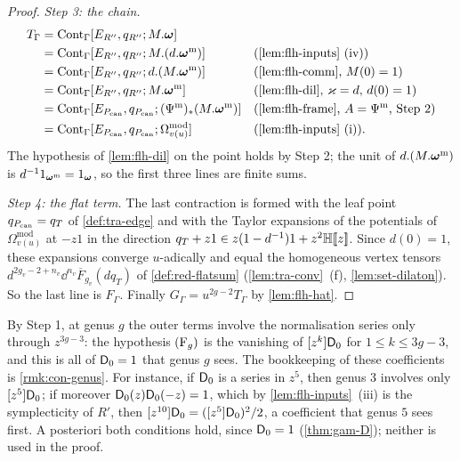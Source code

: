 \begin{proof}
\emph{Step 3: the chain.}
\begin{align*}
T_\Gamma&=\mathrm{Cont}_\Gamma[E_{R''},q_{R''};M.\TFT]&&\\
&=\mathrm{Cont}_\Gamma[E_{R''},q_{R''};M.(d.\TFT^{\mathrm m})]&&\text{(\cref{lem:flh-inputs}~(iv))}\\
&=\mathrm{Cont}_\Gamma[E_{R''},q_{R''};d.(M.\TFT^{\mathrm m})]&&\text{(\cref{lem:flh-comm}, $M(0)=1$)}\\
&=\mathrm{Cont}_\Gamma[E_{R''},q_{R''};M.\TFT^{\mathrm m}]&&\text{(\cref{lem:flh-dil}, $\varkappa=d$, $d(0)=1$)}\\
&=\mathrm{Cont}_\Gamma[E_{\Pc},q_{\Pc};(\Psi^{\mathrm m})_*(M.\TFT^{\mathrm m})]&&\text{(\cref{lem:flh-frame}, $A=\Psi^{\mathrm m}$, Step 2)}\\
&=\mathrm{Cont}_\Gamma[E_{\Pc},q_{\Pc};\Omega^{\mathrm{mod}}_{v(u)}]&&\text{(\cref{lem:flh-inputs}~(i))}.
\end{align*}
The hypothesis of \cref{lem:flh-dil} on the point holds by Step 2; the unit of $d.(M.\boldsymbol{\omega}^{\mathrm m})$ is $d^{-1}1_{\boldsymbol{\omega}^{\mathrm m}}=1_{\boldsymbol{\omega}}$, so the first three lines are finite sums.

\emph{Step 4: the flat term.} The last contraction is formed with the leaf point $q_{P_{\mathrm{can}}}=q_T$ of \cref{def:tra-edge} and with the Taylor expansions of the potentials of $\Omega^{\mathrm{mod}}_{v(u)}$ at $-z1$ in the direction $q_T+z1\in z(1-d^{-1})1+z^2\mathbb{H}[\![ z ]\!]$. Since $d(0)=1$, these expansions converge $u$-adically and equal the homogeneous vertex tensors $d^{2g_v-2+n_v}\dd^{n_v}\overline F_{g_v}(dq_T)$ of \cref{def:red-flatsum} (\cref{lem:tra-conv}~(f), \cref{lem:set-dilaton}). So the last line is $F_\Gamma$. Finally $G_\Gamma=u^{2g-2}T_\Gamma$ by \cref{lem:flh-hat}.
\end{proof}

By Step 1, at genus $g$ the outer terms involve the normalisation series only through $z^{3g-3}$: the hypothesis $(\mathrm{F}_{g})$ is the vanishing of $[z^k]\mathsf{D}_0$ for $1\leq k\leq 3g-3$, and this is all of $\mathsf{D}_0=1$ that genus $g$ sees. The bookkeeping of these coefficients is \cref{rmk:con-genus}. For instance, if $\mathsf{D}_0$ is a series in $z^5$, then genus $3$ involves only $[z^5]\mathsf{D}_0$; if moreover $\mathsf{D}_0(z)\mathsf{D}_0(-z)=1$, which by \cref{lem:flh-inputs}~(iii) is the symplecticity of $R'$, then $[z^{10}]\mathsf{D}_0=([z^5]\mathsf{D}_0)^2/2$, a coefficient that genus $5$ sees first. A posteriori both conditions hold, since $\mathsf{D}_0=1$ (\cref{thm:gam-D}); neither is used in the proof.

